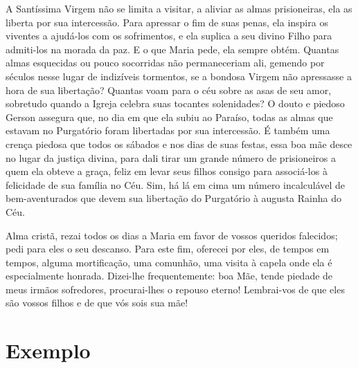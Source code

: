 A Santíssima Virgem não se limita a visitar, a aliviar as almas prisioneiras, ela as liberta por sua intercessão. Para apressar o fim de suas penas, ela inspira os viventes a ajudá-los com os sofrimentos, e ela suplica a seu divino Filho para admiti-los na morada da paz. E o que Maria pede, ela sempre obtém. Quantas almas esquecidas ou pouco socorridas não permaneceriam ali, gemendo por séculos nesse lugar de indizíveis tormentos, se a bondosa Virgem não apressasse a hora de sua libertação? Quantas voam para o céu sobre as asas de seu amor, sobretudo quando a Igreja celebra suas tocantes solenidades? O douto e piedoso Gerson assegura que, no dia em que ela subiu ao Paraíso, todas as almas que estavam no Purgatório foram libertadas por sua intercessão. É também uma crença piedosa que todos os sábados e nos dias de suas festas, essa boa mãe desce no lugar da justiça divina, para dali tirar um grande número de prisioneiros a quem ela obteve a graça, feliz em levar seus filhos consigo para associá-los à felicidade de sua família no Céu. Sim, há lá em cima um número incalculável de bem-aventurados que devem sua libertação do Purgatório à augusta Rainha do Céu.

Alma cristã, rezai todos os dias a Maria em favor de vossos queridos falecidos; pedi para eles o seu descanso. Para este fim, oferecei por eles, de tempos em tempos, alguma mortificação, uma comunhão, uma visita à capela onde ela é especialmente honrada. Dizei-lhe frequentemente: boa Mãe, tende piedade de meus irmãos sofredores, procurai-lhes o repouso eterno! Lembrai-vos de que eles são vossos filhos e de que vós sois sua mãe!


\section*{Exemplo}

